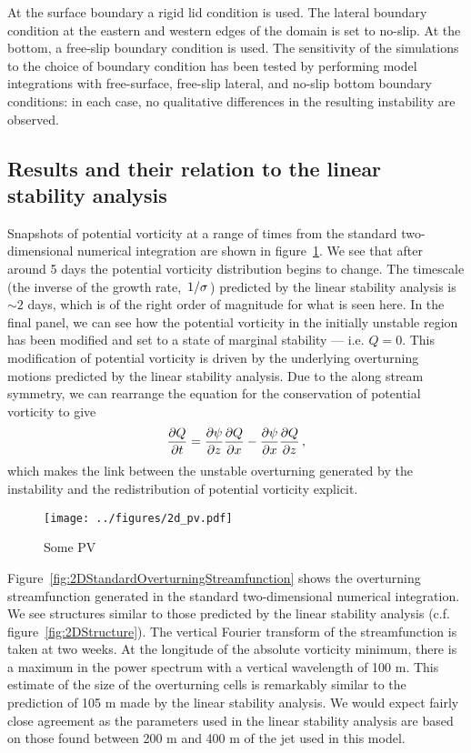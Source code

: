 At the surface boundary a rigid lid condition is used. The lateral boundary condition at the eastern and western edges of the domain is set to no-slip. At the bottom, a free-slip boundary condition is used. The sensitivity of the simulations to the choice of boundary condition has been tested by performing model integrations with free-surface, free-slip lateral, and no-slip bottom boundary conditions: in each case, no qualitative differences in the resulting instability are observed.

\subsection{Results and their relation to the linear stability analysis}
Snapshots of potential vorticity at a range of times from the standard two-dimensional numerical integration are shown in figure~\ref{fig:2DPVSnapshotsStandard}. We see that after around 5 days the potential vorticity distribution begins to change. The timescale (the inverse of the growth rate, $\flatfrac{1}{\sigma}$) predicted by the linear stability analysis is $\sim 2$ days, which is of the right order of magnitude for what is seen here. In the final panel, we can see how the potential vorticity in the initially unstable region has been modified and set to a state of marginal stability --- i.e. $Q = 0$. This modification of potential vorticity is driven by the underlying overturning motions predicted by the linear stability analysis. Due to the along stream symmetry, we can rearrange the equation for the conservation of potential vorticity to give
\begin{equation}
    \label{eq:PVEvolution}
    \pdv{Q}{t} = \pdv{\psi}{z}\pdv{Q}{x} - \pdv{\psi}{x}\pdv{Q}{z} \, ,%
\end{equation}
which makes the link between the unstable overturning generated by the instability and the redistribution of potential vorticity explicit\footnotemark.

\begin{figure}
    \centering
    \texttt{[image: ../figures/2d\_pv.pdf]}
    \caption{Some PV}
    \label{fig:2DPVSnapshotsStandard}
\end{figure}


Figure~\ref{fig:2DStandardOverturningStreamfunction} shows the overturning streamfunction generated in the standard two-dimensional numerical integration. We see structures similar to those predicted by the linear stability analysis (c.f. figure~\ref{fig:2DStructure}). The vertical Fourier transform of the streamfunction is taken at two weeks. At the longitude of the absolute vorticity minimum, there is a maximum in the power spectrum with a vertical wavelength of 100 m. This estimate of the size of the overturning cells is remarkably similar to the prediction of 105 m made by the linear stability analysis. We would expect fairly close agreement as the parameters used in the linear stability analysis are based on those found between 200 m and 400 m of the jet used in this model.

